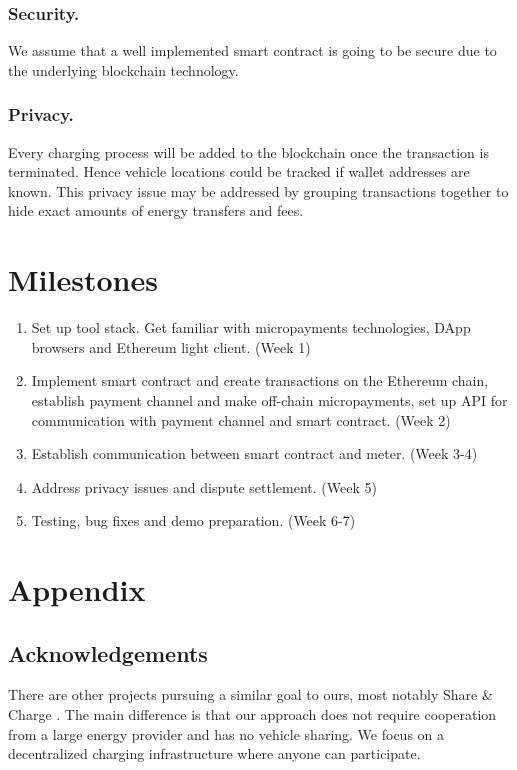 \documentclass[10pt]{adtreport}
\begin{document}
\subsubsection{Security.}
We assume that a well implemented smart contract is going to be secure due to the underlying blockchain technology.

\subsubsection{Privacy.}
Every charging process will be added to the blockchain once the transaction is terminated. Hence vehicle locations could be tracked if wallet addresses are known. This privacy issue may be addressed by grouping transactions together to hide exact amounts of energy transfers and fees.

\section{Milestones}

\begin{enumerate}
\item Set up tool stack. Get familiar with micropayments technologies, DApp browsers and Ethereum light client. (Week 1)

\item Implement smart contract and create transactions on the Ethereum chain, establish payment channel and make off-chain micropayments, set up API for communication with payment channel and smart contract. (Week 2)

\item Establish communication between smart contract and meter. (Week 3-4)

\item Address privacy issues and dispute settlement. (Week 5)

\item Testing, bug fixes and demo preparation. (Week 6-7)
\end{enumerate}





\newpage



\section*{Appendix}
\subsection*{Acknowledgements}
There are other projects pursuing a similar goal to ours, most notably Share \& Charge \cite{share-charge}. The main difference is that our approach does not require cooperation from a large energy provider and has no vehicle sharing. We focus on a decentralized charging infrastructure where anyone can participate.


\printbibliography
\end{document}
